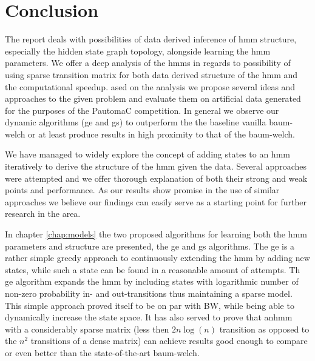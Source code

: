 \chapter{Conclusion}
\label{chap:conclusion}
The report deals with possibilities of data derived inference of \gls{hmm} structure, especially the hidden state graph topology, alongside learning the \gls{hmm} parameters. We offer a deep analysis of the \glspl{hmm} in regards to possibility of using sparse transition matrix for both data derived structure of the \gls{hmm} and the computational  speedup. ased on the analysis we propose several ideas and approaches to the given problem and evaluate them on artificial data generated for the purposes of the PautomaC competition. In general we observe our dynamic algorithms (\acrfull{ge} and \acrfull{gs}) to outperform the the baseline vanilla \gls{baum-welch} or at least produce results in high proximity to that of the \gls{baum-welch}.

We have managed to widely explore the concept of adding states to an \gls{hmm} iteratively to derive the structure of the \gls{hmm} given the data. Several approaches were attempted and we offer thorough explanation of both their strong and weak points and performance. As our results show promise in the use of similar approaches we believe our findings can easily serve as a starting point for further research in the area.

In chapter \ref{chap:models} the two proposed algorithms for learning both the \gls{hmm} parameters and structure are presented, the \acrlong{ge} and \acrlong{gs} algorithms. The \gls{ge} is a rather simple greedy approach to continuously extending the \gls{hmm} by adding new states, while such a state can be found in a reasonable amount of attempts. Th \gls{ge} algorithm expands the \gls{hmm} by including states with logarithmic number of non-zero probability in- and out-transitions thus maintaining a sparse model. This simple approach proved itself to be on par with BW, while being able to dynamically increase the state space. It has also served to prove that an\gls{hmm} with a considerably sparse matrix (less then $2n\log(n)$ transition as opposed to the $n^2$ transitions of a dense matrix) can achieve results good enough to compare or even better than the state-of-the-art \gls{baum-welch}.

